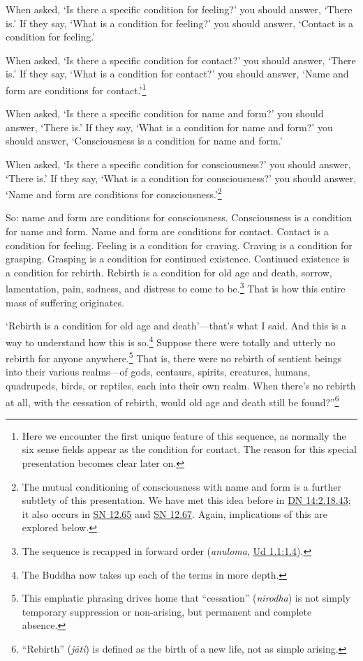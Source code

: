 \documentclass[12pt,openany]{book}%
\begin{document}
When asked, ‘Is there a specific condition for feeling?’ you should answer, ‘There is.’ If they say, ‘What is a condition for feeling?’ you should answer, ‘Contact is a condition for feeling.’ 

When asked, ‘Is there a specific condition for contact?’ you should answer, ‘There is.’ If they say, ‘What is a condition for contact?’ you should answer, ‘Name and form are conditions for contact.’\footnote{Here we encounter the first unique feature of this sequence, as normally the six sense fields appear as the condition for contact. The reason for this special presentation becomes clear later on. } 

When asked, ‘Is there a specific condition for name and form?’ you should answer, ‘There is.’ If they say, ‘What is a condition for name and form?’ you should answer, ‘Consciousness is a condition for name and form.’ 

When asked, ‘Is there a specific condition for consciousness?’ you should answer, ‘There is.’ If they say, ‘What is a condition for consciousness?’ you should answer, ‘Name and form are conditions for consciousness.’\footnote{The mutual conditioning of consciousness with name and form is a further subtlety of this presentation. We have met this idea before in \href{https://suttacentral.net/dn14/en/sujato\#2.18.43}{DN 14:2.18.43}; it also occurs in \href{https://suttacentral.net/sn12.65/en/sujato}{SN 12.65} and \href{https://suttacentral.net/sn12.67/en/sujato}{SN 12.67}. Again, implications of this are explored below. } 

So: name and form are conditions for consciousness. Consciousness is a condition for name and form. Name and form are conditions for contact. Contact is a condition for feeling. Feeling is a condition for craving. Craving is a condition for grasping. Grasping is a condition for continued existence. Continued existence is a condition for rebirth. Rebirth is a condition for old age and death, sorrow, lamentation, pain, sadness, and distress to come to be.\footnote{The sequence is recapped in forward order (\textit{anuloma}, \href{https://suttacentral.net/ud1.1/en/sujato\#1.4}{Ud 1.1:1.4}). } That is how this entire mass of suffering originates. 

‘Rebirth is a condition for old age and death’—that’s what I said. And this is a way to understand how this is so.\footnote{The Buddha now takes up each of the terms in more depth. } Suppose there were totally and utterly no rebirth for anyone anywhere.\footnote{This emphatic phrasing drives home that “cessation” (\textit{nirodha}) is not simply temporary suppression or non-arising, but permanent and complete absence. } That is, there were no rebirth of sentient beings into their various realms—of gods, centaurs, spirits, creatures, humans, quadrupeds, birds, or reptiles, each into their own realm. When there’s no rebirth at all, with the cessation of rebirth, would old age and death still be found?”\footnote{“Rebirth” (\textit{\textsanskrit{jāti}}) is defined as the birth of a new life, not as simple arising. } 
\end{document}
